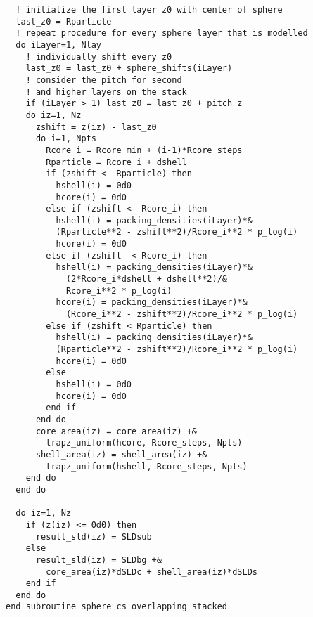 \documentclass[\main/dresen_thesis.tex]{subfiles}
\begin{document}
\begin{lstlisting}
  ! initialize the first layer z0 with center of sphere
  last_z0 = Rparticle 
  ! repeat procedure for every sphere layer that is modelled
  do iLayer=1, Nlay 
    ! individually shift every z0  
    last_z0 = last_z0 + sphere_shifts(iLayer) 
    ! consider the pitch for second
    ! and higher layers on the stack
    if (iLayer > 1) last_z0 = last_z0 + pitch_z 
    do iz=1, Nz
      zshift = z(iz) - last_z0
      do i=1, Npts
        Rcore_i = Rcore_min + (i-1)*Rcore_steps
        Rparticle = Rcore_i + dshell
        if (zshift < -Rparticle) then
          hshell(i) = 0d0
          hcore(i) = 0d0
        else if (zshift < -Rcore_i) then
          hshell(i) = packing_densities(iLayer)*&
          (Rparticle**2 - zshift**2)/Rcore_i**2 * p_log(i)
          hcore(i) = 0d0
        else if (zshift  < Rcore_i) then
          hshell(i) = packing_densities(iLayer)*&
            (2*Rcore_i*dshell + dshell**2)/&
            Rcore_i**2 * p_log(i)
          hcore(i) = packing_densities(iLayer)*&
            (Rcore_i**2 - zshift**2)/Rcore_i**2 * p_log(i)
        else if (zshift < Rparticle) then
          hshell(i) = packing_densities(iLayer)*&
          (Rparticle**2 - zshift**2)/Rcore_i**2 * p_log(i)
          hcore(i) = 0d0
        else
          hshell(i) = 0d0
          hcore(i) = 0d0
        end if
      end do
      core_area(iz) = core_area(iz) +&
        trapz_uniform(hcore, Rcore_steps, Npts)
      shell_area(iz) = shell_area(iz) +&
        trapz_uniform(hshell, Rcore_steps, Npts)
    end do
  end do

  do iz=1, Nz
    if (z(iz) <= 0d0) then
      result_sld(iz) = SLDsub
    else
      result_sld(iz) = SLDbg +&
        core_area(iz)*dSLDc + shell_area(iz)*dSLDs
    end if
  end do
end subroutine sphere_cs_overlapping_stacked
  \end{lstlisting}
\end{document}
